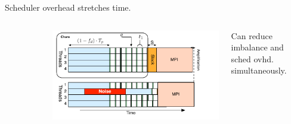 \begin{frame}[label=hybridstatdyn]
\begin{columns}
\begin{center}
  \end{center}
\vspace*{-0.3in}
\begin{center}
{\tiny Scheduler overhead stretches time.}
\end{center}
\end{columns}
\begin{columns}
\vspace*{-0.1in}
\begin{figure} 

\end{figure}
\begin{center}
\includegraphics[scale=0.31]{./images/threadedCompRegion-hybrid}
\end{center}
\vspace*{-0.3in}
\begin{center}
{\tiny Can reduce imbalance and sched ovhd. simultaneously.}


\end{center}
\end{columns}
\end{frame}


